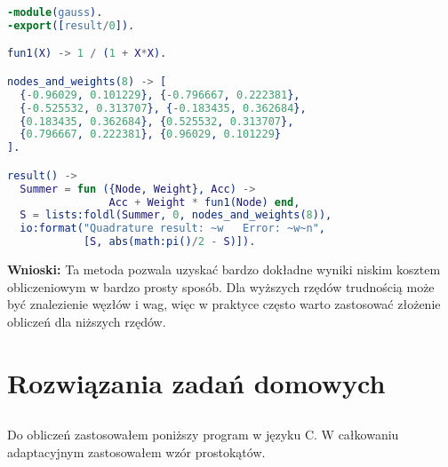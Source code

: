 \documentclass{article}
\begin{document}
\begin{lstlisting}[language=Erlang]
-module(gauss).
-export([result/0]).

fun1(X) -> 1 / (1 + X*X).

nodes_and_weights(8) -> [
  {-0.96029, 0.101229}, {-0.796667, 0.222381},
  {-0.525532, 0.313707}, {-0.183435, 0.362684},
  {0.183435, 0.362684}, {0.525532, 0.313707},
  {0.796667, 0.222381}, {0.96029, 0.101229}
].

result() ->
  Summer = fun ({Node, Weight}, Acc) ->
                Acc + Weight * fun1(Node) end,
  S = lists:foldl(Summer, 0, nodes_and_weights(8)),
  io:format("Quadrature result: ~w   Error: ~w~n",
            [S, abs(math:pi()/2 - S)]).
\end{lstlisting}

\noindent
\textbf{Wnioski:} Ta metoda pozwala uzyskać bardzo dokładne wyniki niskim kosztem obliczeniowym w bardzo prosty sposób. Dla wyższych rzędów trudnością może być znalezienie węzłów i wag, więc w praktyce często warto zastosować złożenie obliczeń dla niższych rzędów.

\newpage

\section{Rozwiązania zadań domowych}

\subsection{}
Do obliczeń zastosowałem poniższy program w języku C. W całkowaniu adaptacyjnym zastosowałem wzór prostokątów.
\end{document}
